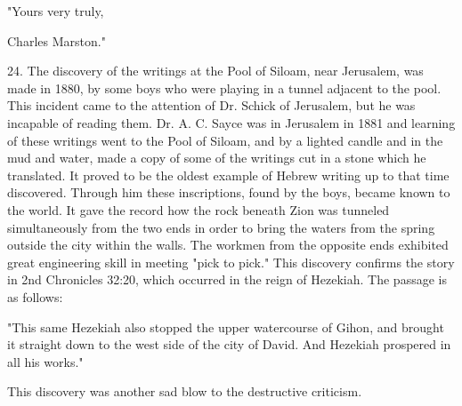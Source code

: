 "Yours very truly,

Charles Marston."

24. The discovery of the writings at the Pool of Siloam, near Jerusalem, was made in 1880,
by some boys who were playing in a tunnel adjacent to the pool. This incident came to the
attention of Dr. Schick of Jerusalem, but he was incapable of reading them. Dr. A. C. Sayce
was in Jerusalem in 1881 and learning of these writings went to the Pool of Siloam, and by a
lighted candle and in the mud and water, made a copy of some of the writings cut in a stone
which he translated. It proved to be the oldest example of Hebrew writing up to that time
discovered. Through him these inscriptions, found by the boys, became known to the world.
It gave the record how the rock beneath Zion was tunneled simultaneously from the two ends
in order to bring the waters from the spring outside the city within the walls. The workmen
from the opposite ends exhibited great engineering skill in meeting "pick to pick." This
discovery confirms the story in 2nd Chronicles 32:20, which occurred in the reign of
Hezekiah. The passage is as follows:

"This same Hezekiah also stopped the upper watercourse of Gihon, and brought it straight
down to the west side of the city of David. And Hezekiah prospered in all his works."

This discovery was another sad blow to the destructive criticism.

